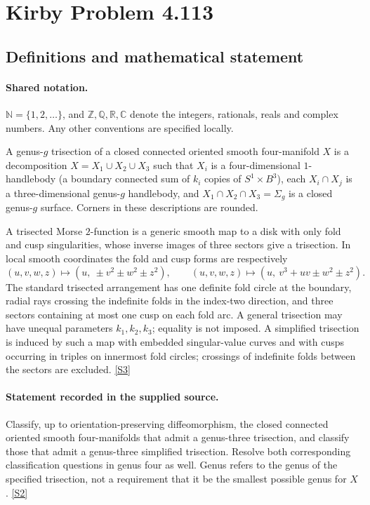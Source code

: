 \documentclass[11pt]{article}
\newcommand{\sref}[2]{\hyperlink{source:#1:#2}{[S#2]}}
\begin{document}
\section{Kirby Problem 4.113}\label{statement}

\subsection{Definitions and mathematical statement}

\paragraph{Shared notation.}$\mathbb N=\{1,2,\ldots\}$, and $\mathbb Z,\mathbb Q,\mathbb R,\mathbb C$ denote the integers, rationals, reals and complex numbers. Any other conventions are specified locally.


A genus-$g$ trisection of a closed connected oriented smooth four-manifold $X$ is a decomposition $X=X_1\cup X_2\cup X_3$ such that $X_i$ is a four-dimensional $1$-handlebody (a boundary connected sum of $k_i$ copies of $S^1\times B^3$), each $X_i\cap X_j$ is a three-dimensional genus-$g$ handlebody, and $X_1\cap X_2\cap X_3=\Sigma_g$ is a closed genus-$g$ surface. Corners in these descriptions are rounded.

A trisected Morse $2$-function is a generic smooth map to a disk with only fold and cusp singularities, whose inverse images of three sectors give a trisection. In local smooth coordinates the fold and cusp forms are respectively
\[
 (u,v,w,z)\mapsto(u,\ \pm v^2\pm w^2\pm z^2),\qquad
 (u,v,w,z)\mapsto(u,\ v^3+uv\pm w^2\pm z^2).
\]
The standard trisected arrangement has one definite fold circle at the boundary, radial rays crossing the indefinite folds in the index-two direction, and three sectors containing at most one cusp on each fold arc. A general trisection may have unequal parameters $k_1,k_2,k_3$; equality is not imposed. A simplified trisection is induced by such a map with embedded singular-value curves and with cusps occurring in triples on innermost fold circles; crossings of indefinite folds between the sectors are excluded. \sref{statement}{3}
\paragraph{Statement recorded in the supplied source.}
Classify, up to orientation-preserving diffeomorphism, the closed connected oriented smooth four-manifolds that admit a genus-three trisection, and classify those that admit a genus-three simplified trisection. Resolve both corresponding classification questions in genus four as well. Genus refers to the genus of the specified trisection, not a requirement that it be the smallest possible genus for $X$. \sref{statement}{2}
\end{document}
